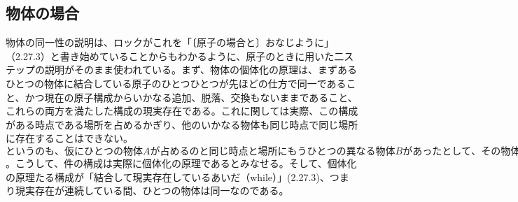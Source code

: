 \documentclass[a4j,oneside]{jsbook}
\begin{document}
\subsection*{
物体の場合
}
物体の同一性の説明は、ロックがこれを「〔原子の場合と〕おなじように」（2.27.3）と書き始めていることからもわかるように、原子のときに用いた二ステップの説明がそのまま使われている。まず、物体の個体化の原理は、まずあるひとつの物体に結合している原子のひとつひとつが先ほどの仕方で同一であること、かつ現在の原子構成からいかなる追加、脱落、交換もないままであること、これらの両方を満たした構成の現実存在である。これに関しては実際、この構成がある時点である場所を占めるかぎり、他のいかなる物体も同じ時点で同じ場所に存在することはできない。$というのも、仮にひとつの物体Aが占めるのと同じ時点と場所にもうひとつの異なる物体Bがあったとして、その物体Aと物体Bはそのとき合体して、ひとつの、AともBとも異なる物体になってしまっている状態でしか考えられないからである。しかるに、この合体した物体はその合体の時にそれ以前にあった物体とは構成が変わって新たに生まれた事物であり、それ以前に存在していた物体A、物体Bのいずれとも起源が異なるので、先に示した単一起源の原理、すなわち、同じものはすべてひとつの起源をもつという原理より、物体Aとも物体Bとも同じではない$。こうして、件の構成は実際に個体化の原理であるとみなせる。そして、個体化の原理たる構成が「結合して現実存在しているあいだ（while）」(2.27.3)、つまり現実存在が連続している間、ひとつの物体は同一なのである。
\end{document}
